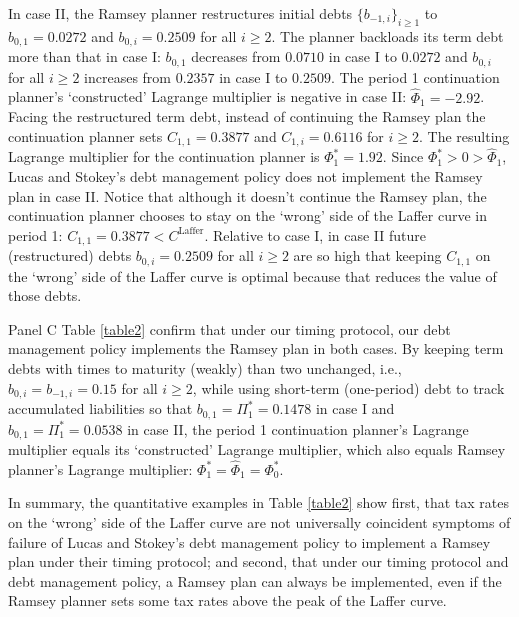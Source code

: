 \documentclass[12pt]{article}
\begin{document}
In case II, the Ramsey planner restructures  initial debts $\{b_{-1,i}\}_{i\geq 1}$ to $b_{0, 1}=0.0272$ and $b_{0, i}=0.2509$  for all $i\geq 2$. 
The planner backloads its term debt more than that in case I: $b_{0,1}$ decreases from $0.0710$ in case I to  $0.0272$ and  $b_{0,i}$ for all $i\geq 2$ increases from $0.2357$ in case I to $0.2509$.
The period 1 continuation planner's  `constructed' Lagrange multiplier is negative in case II: $\widehat{\Phi}_1=-2.92$. Facing the restructured term debt, instead of continuing  the Ramsey plan the continuation planner sets  $C_{1, 1}=0.3877$ and $C_{1, i}=0.6116$ for $i\geq 2$.  The resulting  Lagrange multiplier for   the continuation planner is ${\Phi}_1^\ast=1.92$. Since ${\Phi}_1^\ast>0>\widehat{\Phi}_1$, Lucas and Stokey's debt management policy does not  implement the Ramsey plan in case II.  
Notice that although it doesn't continue  the Ramsey plan,
the continuation  planner  chooses to stay on the `wrong' side of the Laffer curve in period 1:  $C_{1, 1}=0.3877 <C^{\text{Laffer}}$. 
Relative  to case I, in case II future (restructured) debts $b_{0, i}=0.2509$ for all $i\geq 2$ are   so high that keeping  $C_{1, 1}$ on the `wrong' side of the Laffer curve is optimal because  
that   reduces the value of those debts. %


Panel C Table \ref{table2} confirm that under our timing protocol, our debt management policy implements the Ramsey plan in both cases. 
By keeping term debts with times to maturity (weakly) than two unchanged, i.e.,  $b_{0, i}=b_{-1, i}=0.15$  for all $i\geq 2$, while  using short-term (one-period) debt to track accumulated liabilities so that $b_{0, 1}= \Pi_1^\ast = 0.1478$ in case I and $b_{0, 1}= \Pi_1^\ast = 0.0538$ in case II,  the period 1  continuation planner's Lagrange multiplier  equals  its  `constructed' Lagrange multiplier, which also equals Ramsey planner's Lagrange multiplier:  $\Phi_1^*=\widehat{\Phi}_1=\Phi_0^*$. %

In summary, the quantitative examples in Table \ref{table2} %
show first, 
that tax rates on the `wrong' side of the Laffer curve are not universally coincident  symptoms of failure of Lucas and Stokey's debt management policy  to implement a  Ramsey plan  under
their timing protocol; and second, that under our timing protocol and debt management policy, a Ramsey plan can always  be implemented, even if  the Ramsey planner sets some tax rates above the peak of the Laffer curve. 
\end{document}
